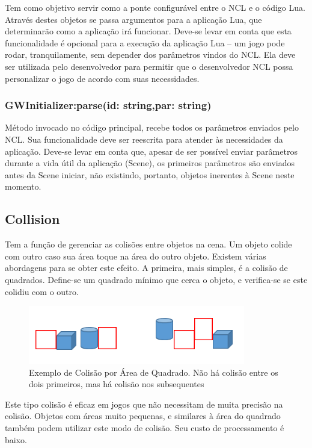 \documentclass[
	12pt,				%
	openright,			%
	oneside,			%
	a4paper,			%
	brazil,				%
	]{abntex2}
\begin{document}
Tem como objetivo servir como a ponte configurável entre o NCL e o código Lua. Através destes objetos se passa argumentos para a aplicação Lua, que determinarão como a aplicação irá funcionar. Deve-se levar em conta que esta funcionalidade é opcional para a execução da aplicação Lua – um jogo pode rodar, tranquilamente, sem depender dos parâmetros vindos do NCL. Ela deve ser utilizada pelo desenvolvedor para permitir que o desenvolvedor NCL possa personalizar o jogo de acordo com suas necessidades.

\subsubsection{GWInitializer:parse(id: string,par: string)}

Método invocado no código principal, recebe todos os parâmetros enviados pelo NCL. Sua funcionalidade deve ser reescrita para atender às necessidades da aplicação. Deve-se levar em conta que, apesar de ser possível enviar parâmetros durante a vida útil da aplicação (Scene), os primeiros parâmetros são enviados antes da Scene iniciar, não existindo, portanto, objetos inerentes à Scene neste momento.

\subsection{Collision}

Tem a função de gerenciar as colisões entre objetos na cena. Um objeto colide com outro caso sua área toque na área do outro objeto. Existem várias abordagens para se obter este efeito. A primeira, mais simples, é a colisão de quadrados. Define-se um quadrado mínimo que cerca o objeto, e verifica-se se este colidiu com o outro. 

\begin{figure}
\centering
\includegraphics{colisao_quadro.png}
\caption{Exemplo de Colisão por Área de Quadrado. Não há colisão entre os dois primeiros, mas há colisão nos subsequentes}
\label{fig:colisaoQuadro}
\end{figure}

Este tipo colisão é eficaz em jogos que não necessitam de muita precisão na colisão. Objetos com áreas muito pequenas, e similares à área do quadrado também podem utilizar este modo de colisão. Seu custo de processamento é baixo.
\end{document}
